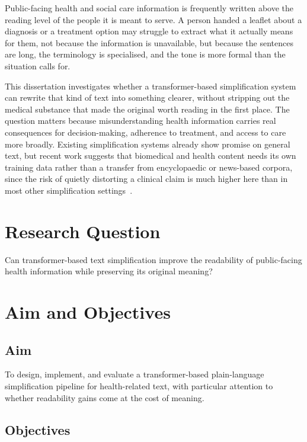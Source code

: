 Public-facing health and social care information is frequently written above the reading level of the people it is meant to serve. A person handed a leaflet about a diagnosis or a treatment option may struggle to extract what it actually means for them, not because the information is unavailable, but because the sentences are long, the terminology is specialised, and the tone is more formal than the situation calls for.

This dissertation investigates whether a transformer-based simplification system can rewrite that kind of text into something clearer, without stripping out the medical substance that made the original worth reading in the first place. The question matters because misunderstanding health information carries real consequences for decision-making, adherence to treatment, and access to care more broadly. Existing simplification systems already show promise on general text, but recent work suggests that biomedical and health content needs its own training data rather than a transfer from encyclopaedic or news-based corpora, since the risk of quietly distorting a clinical claim is much higher here than in most other simplification settings~\cite{bakker2024cochraneauto,zhang2020bertscore}.

\section{Research Question}
\label{sec:research-question}

Can transformer-based text simplification improve the readability of public-facing health information while preserving its original meaning?

\section{Aim and Objectives}
\label{sec:aims-objectives}

\subsection*{Aim}

To design, implement, and evaluate a transformer-based plain-language simplification pipeline for health-related text, with particular attention to whether readability gains come at the cost of meaning.

\subsection*{Objectives}

